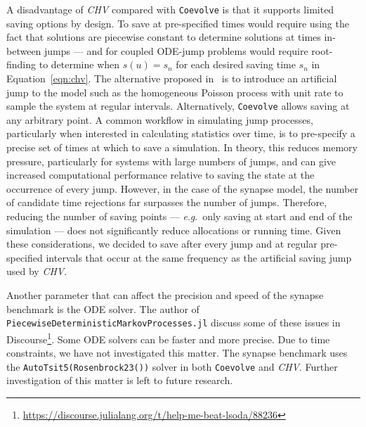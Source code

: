 \documentclass{juliacon}
\numberwithin{equation}{section}
\newcommand{\eg}{\textit{e}.\textit{g}.}
\begin{document}
A disadvantage of \textit{CHV} compared with \texttt{Coevolve} is that it supports limited saving options by design. To save at pre-specified times would require using the fact that solutions are piecewise constant to determine solutions at times in-between jumps --- and for coupled ODE-jump problems would require root-finding to determine when \( s(u) = s_n \) for each desired saving time \( s_n \) in Equation~\ref{eqn:chv}. The alternative proposed in~\cite{veltz2015} is to introduce an artificial jump to the model such as the homogeneous Poisson process with unit rate to sample the system at regular intervals. Alternatively, \texttt{Coevolve} allows saving at any arbitrary point. A common workflow in simulating jump processes, particularly when interested in calculating statistics over time, is to pre-specify a precise set of times at which to save a simulation. In theory, this reduces memory pressure, particularly for systems with large numbers of jumps, and can give increased computational performance relative to saving the state at the occurrence of every jump. However, in the case of the synapse model, the number of candidate time rejections far surpasses the number of jumps. Therefore, reducing the number of saving points --- \eg~only saving at start and end of the simulation --- does not significantly reduce allocations or running time. Given these considerations, we decided to save after every jump and at regular pre-specified intervals that occur at the same frequency as the artificial saving jump used by \textit{CHV}.

Another parameter that can affect the precision and speed of the synapse benchmark is the ODE solver. The author of \texttt{PiecewiseDeterministicMarkovProcesses.jl} discuss some of these issues in Discourse\footnote{\url{https://discourse.julialang.org/t/help-me-beat-lsoda/88236}}. Some ODE solvers can be faster and more precise. Due to time constraints, we have not investigated this matter. The synapse benchmark uses the \texttt{AutoTsit5(Rosenbrock23())} solver in both \texttt{Coevolve} and \textit{CHV}. Further investigation of this matter is left to future research.
\end{document}
